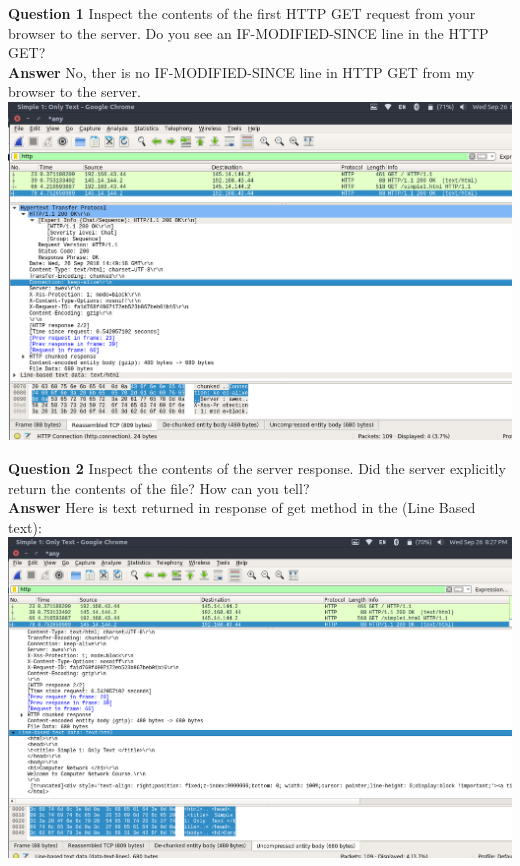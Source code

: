 \documentclass[14pt]{extarticle}
\begin{document}
    \noindent
    \textbf{\large Question 1}
    Inspect the contents of the first HTTP GET request from your browser to the server.
    Do you see an IF-MODIFIED-SINCE line in the HTTP GET?\\
    \textbf{\large Answer}
    No, ther is no IF-MODIFIED-SINCE line in HTTP GET from my browser to the server.\\[10pt]
    \includegraphics[scale=0.40]{1_2}
    \vspace{1cm}

    \noindent
    \textbf{\large Question 2}
    Inspect the contents of the server response. Did the server explicitly return the contents of the file?
    How can you tell?\\
    \textbf{\large Answer}
    Here is text returned in response of get method in the (Line Based text):\\[10pt]
    \includegraphics[scale=0.40]{1_3}
    \vspace{1cm}
\end{document}
